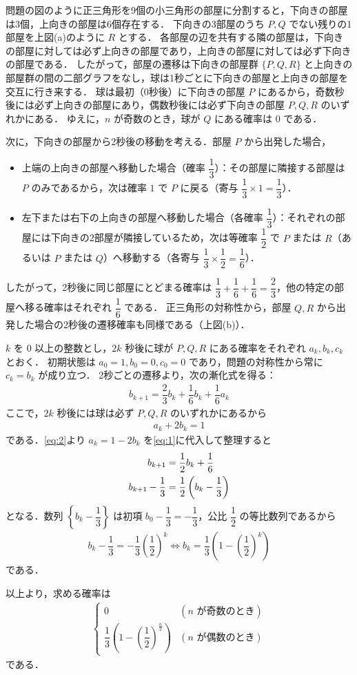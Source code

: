 \documentclass[../../main.tex]{subfiles}
\begin{document}
問題の図のように正三角形を9個の小三角形の部屋に分割すると，下向きの部屋は3個，上向きの部屋は6個存在する．
下向きの3部屋のうち $P, Q$ でない残りの1部屋を上図(a)のように $R$ とする．
各部屋の辺を共有する隣の部屋は，下向きの部屋に対しては必ず上向きの部屋であり，上向きの部屋に対しては必ず下向きの部屋である．
したがって，部屋の遷移は下向きの部屋群 $\{P, Q, R\}$ と上向きの部屋群の間の二部グラフをなし，球は1秒ごとに下向きの部屋と上向きの部屋を交互に行き来する．
球は最初（$0$秒後）に下向きの部屋 $P$ にあるから，奇数秒後には必ず上向きの部屋にあり，偶数秒後には必ず下向きの部屋 $P, Q, R$ のいずれかにある．
ゆえに，$n$ が奇数のとき，球が $Q$ にある確率は $0$ である．

次に，下向きの部屋から2秒後の移動を考える．部屋 $P$ から出発した場合，
\begin{itemize}
  \item 上端の上向きの部屋へ移動した場合（確率 $\dfrac{1}{3}$）：その部屋に隣接する部屋は $P$ のみであるから，次は確率 $1$ で $P$ に戻る（寄与 $\dfrac{1}{3} \times 1 = \dfrac{1}{3}$）．
  \item 左下または右下の上向きの部屋へ移動した場合（各確率 $\dfrac{1}{3}$）：それぞれの部屋には下向きの2部屋が隣接しているため，次は等確率 $\dfrac{1}{2}$ で $P$ または $R$（あるいは $P$ または $Q$）へ移動する（各寄与 $\dfrac{1}{3} \times \dfrac{1}{2} = \dfrac{1}{6}$）．
\end{itemize}
したがって，2秒後に同じ部屋にとどまる確率は $\dfrac{1}{3} + \dfrac{1}{6} + \dfrac{1}{6} = \dfrac{2}{3}$，他の特定の部屋へ移る確率はそれぞれ $\dfrac{1}{6}$ である．
正三角形の対称性から，部屋 $Q, R$ から出発した場合の2秒後の遷移確率も同様である（上図(b)）．

$k$ を $0$ 以上の整数とし，$2k$ 秒後に球が $P, Q, R$ にある確率をそれぞれ $a_k, b_k, c_k$ とおく．
初期状態は $a_0 = 1, b_0 = 0, c_0 = 0$ であり，問題の対称性から常に $c_k = b_k$ が成り立つ．
2秒ごとの遷移より，次の漸化式を得る：
\begin{align}
  b_{k+1} = \dfrac{2}{3} b_k + \dfrac{1}{6} b_k + \dfrac{1}{6} a_k \label{eq:1}
\end{align}
ここで，$2k$ 秒後には球は必ず $P, Q, R$ のいずれかにあるから
\begin{align}
  a_k + 2b_k = 1 \label{eq:2}
\end{align}
である．\cref{eq:2}より $a_k = 1 - 2b_k$ を\cref{eq:1}に代入して整理すると
\begin{align}
  b_{k+1} &= \dfrac{1}{2} b_k + \dfrac{1}{6} \notag \\
  b_{k+1} - \dfrac{1}{3} &= \dfrac{1}{2} \left( b_k - \dfrac{1}{3} \right)
\end{align}
となる．数列 $\left\{ b_k - \dfrac{1}{3} \right\}$ は初項 $b_0 - \dfrac{1}{3} = -\dfrac{1}{3}$，公比 $\dfrac{1}{2}$ の等比数列であるから
\begin{align}
  b_k - \dfrac{1}{3} = -\dfrac{1}{3}\left(\dfrac{1}{2}\right)^k \iff b_k = \dfrac{1}{3}\left(1 - \left(\dfrac{1}{2}\right)^k\right)
\end{align}
である．

以上より，求める確率は
\begin{align}
  \begin{cases}
    0 & (n \text{ が奇数のとき}) \\
    \dfrac{1}{3} \left( 1 - \left(\dfrac{1}{2}\right)^{\frac{n}{2}} \right) & (n \text{ が偶数のとき})
  \end{cases}
\end{align}
である．
\end{document}
